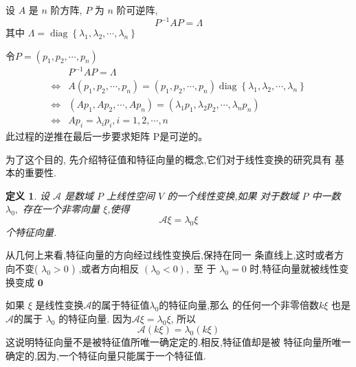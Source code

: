\documentclass[13pt]{beamer}
\newtheorem*{defi}{定义}
\def\A{\mathscr{A}}
\begin{document}
\begin{frame}


设 $A$ 是 $n$ 阶方阵, ${P}$ 为 ${n}$ 阶可逆阵, 
$${P}^{-1} {A P}=\Lambda$$
其中
$\Lambda =\operatorname{diag}\left\{\lambda_{1}, \lambda_{2}, \cdots, \lambda_{n}\right\}$

令$P=\left(p_{1}, p_{2}, \cdots, p_{n}\right)$
\begin{align*}
& {P}^{-1} {A} P=\Lambda \\
\Leftrightarrow & 	A \left(p_{1}, p_{2}, \cdots, p_{n}\right)
=\left(p_{1}, p_{2}, \cdots, p_{n}\right) 
\operatorname{diag}\left\{\lambda_{1}, \lambda_{2}, \cdots, \lambda_{n}\right\}\\
\Leftrightarrow	&	\left(A p_{1}, A p_{2}, \cdots, A p_{n}\right)	
=	\left(\lambda_{1} p_{1}, \lambda_{2} p_{2}, \cdots, \lambda_{n} p_{n}\right)\\
\Leftrightarrow &  A p_{i}=\lambda_{i} p_{i}, i=1,2, \cdots, n
\end{align*}
此过程的逆推在最后一步要求矩阵 P是可逆的。
\end{frame}

\begin{frame}
为了这个目的,  先介绍特征值和特征向量的概念,它们对于线性变换的研究具有 基本的重要性.  
\begin{defi}
设 $\A$ 是数域 $P$ 上线性空间 $V$ 的一个线性变换,如果 对于数域 $P$ 中一数 $\lambda_{0},$ 存在一个非零向量 ${\xi}$,使得
\[
\A \xi=\lambda_{0} \xi
\]
个特征向量. 
\end{defi}
从几何上来看,特征向量的方向经过线性变换后,保持在同一 条直线上,这时或者方向不变( $\lambda_{0}>0$ ) ,或者方向相反 $\left(\lambda_{0}<0\right),$ 至
于 $\lambda_{0}=0$ 时,特征向量就被线性变换变成 $\mathbf{0}$
\end{frame}



\begin{frame}
如果 $\xi$ 是线性变换$\A$的属于特征值$\lambda_0$的特征向量,那么 的任何一个非零倍数$k\xi$ 也是 $\A$的属于 $\lambda_{0}$ 的特征向量. 因为$\A \xi=\lambda_{0} \xi$, 所以
\[
\mathscr{A}(k \xi)=\lambda_{0}(k \xi)
\]
这说明特征向量不是被特征值所唯一确定定的.相反,特征值却是被 特征向量所唯一确定的,因为,一个特征向量只能属于一个特征值.
\end{frame}
\end{document}
